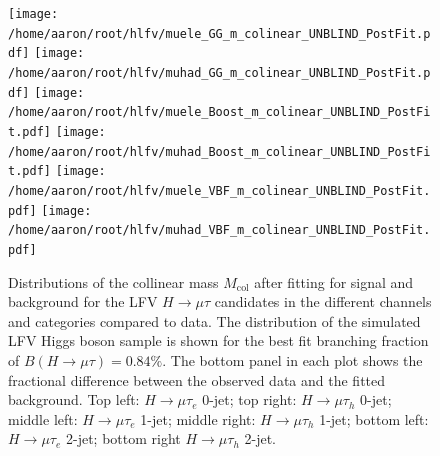 \documentclass[oneside, letterpaper, oldfontcommands]{memoir}
\begin{document}
\begin{figure}[hbtp]\centering
 \texttt{[image: /home/aaron/root/hlfv/muele\_GG\_m\_colinear\_UNBLIND\_PostFit.pdf]}
 \texttt{[image: /home/aaron/root/hlfv/muhad\_GG\_m\_colinear\_UNBLIND\_PostFit.pdf]}
 \texttt{[image: /home/aaron/root/hlfv/muele\_Boost\_m\_colinear\_UNBLIND\_PostFit.pdf]}
 \texttt{[image: /home/aaron/root/hlfv/muhad\_Boost\_m\_colinear\_UNBLIND\_PostFit.pdf]}
 \texttt{[image: /home/aaron/root/hlfv/muele\_VBF\_m\_colinear\_UNBLIND\_PostFit.pdf]}
 \texttt{[image: /home/aaron/root/hlfv/muhad\_VBF\_m\_colinear\_UNBLIND\_PostFit.pdf]}
 \caption{Distributions of the collinear mass $M_\text{col}$ after fitting for signal and background  for the LFV $H \rightarrow \mu \tau$ candidates in
the different
channels and categories compared to data.
The distribution of the simulated LFV Higgs boson sample is shown for the best fit branching fraction
of $B(H \rightarrow \mu \tau )=0.84\%$.
The bottom panel in each plot shows the fractional difference between the observed data and the fitted background. Top left: $H \rightarrow \mu \tau_{e}$ 0-jet; top right: $H \rightarrow \mu \tau_{h}$ 0-jet;
middle left: $H \rightarrow \mu \tau_{e}$ 1-jet; middle right: $H \rightarrow \mu \tau_{h}$ 1-jet; bottom left: $H \rightarrow \mu \tau_{e}$ 2-jet; bottom right $H \rightarrow \mu \tau_{h}$ 2-jet.}
 \label{fig:Mcol_Postfit}\end{figure}
\end{document}
